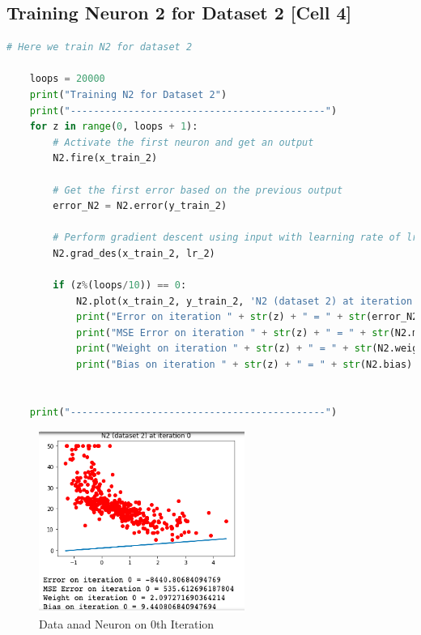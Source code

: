 \documentclass[a4paper, 12pt]{article}
\begin{document}
    \pagebreak

    \subsection{Training Neuron 2 for Dataset 2 [Cell 4]}

    \begin{lstlisting}[language=python, caption=Dataset 2 Training Code (Cell 2)]
    # Here we train N2 for dataset 2

    loops = 20000
    print("Training N2 for Dataset 2")
    print("--------------------------------------------")
    for z in range(0, loops + 1):
        # Activate the first neuron and get an output
        N2.fire(x_train_2)
        
        # Get the first error based on the previous output
        error_N2 = N2.error(y_train_2)
    
        # Perform gradient descent using input with learning rate of lr_2
        N2.grad_des(x_train_2, lr_2)
    
        if (z%(loops/10)) == 0:
            N2.plot(x_train_2, y_train_2, 'N2 (dataset 2) at iteration ' + str(z))
            print("Error on iteration " + str(z) + " = " + str(error_N2.sum()))
            print("MSE Error on iteration " + str(z) + " = " + str(N2.mse(y_train_1)))
            print("Weight on iteration " + str(z) + " = " + str(N2.weight))
            print("Bias on iteration " + str(z) + " = " + str(N2.bias) + '\n')
            
    
    print("--------------------------------------------")\end{lstlisting}

    \begin{figure}[h!]
        \centering
        \captionsetup{justification=centering}
        \centering
            \includegraphics[width=0.6\textwidth]{4.png}
            \caption{Data anad Neuron on 0th Iteration}
    \end{figure}
\end{document}
